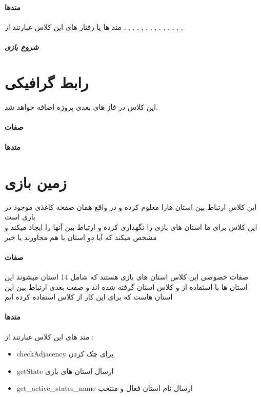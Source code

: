 \documentclass[pdf,titlepage,a4paper]{report}
\begin{document}
	\paragraph{متدها}
	متد ها یا رفتار های این کلاس عبارتند از 
	 ,  ,  ,  ,  ,  ,  , 
	 ,  ,  ,  ,  ,  , 
	 , 
	\subparagraph{شروع بازی}
	
	
	\newpage
	\section{رابط گرافیکی}
	 این کلاس در فاز های بعدی پروژه اضافه خواهد شد. \\
	\paragraph{صفات}
	\paragraph{متدها}


	\newpage
	\section{زمین بازی}
    این کلاس ارتباط بین استان هارا معلوم کرده و در واقع همان صفحه کاغذی موجود در بازی است \\
    این کلاس برای ما استان های بازی را نگهداری کرده و ارتباط بین آنها را ایجاد میکند و مشخص میکند که آیا دو استان با هم مجاورند یا خیر 

	\paragraph{صفات}
	صفات خصوصی این کلاس استان های بازی هستند که شامل 14 استان میشوند 
	این استان ها با استفاده از  و کلاس استان گرفته شده اند
	و صفت بعدی ارتباط بین این استان هاست که برای این کار از کلاس  استفاده کرده ایم
	\paragraph{متدها}
	
	متد های این کلاس عبارتند از :

	\begin{latin}
		\begin{itemize}
			\item checkAdjacency برای چک کردن 
			\item getState ارسال استان های بازی 
			\item get\_active\_states\_name ارسال نام استان فعال و منتخب
		\end{itemize}
	\end{latin}
	
\end{document}
